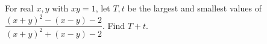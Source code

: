 For real $x,y$ with $xy=1$, let $T,t$ be the largest and smallest values of $\dfrac{(x+y)^2-(x-y)-2}{(x+y)^2+(x-y)-2}$. Find $T+t$.
